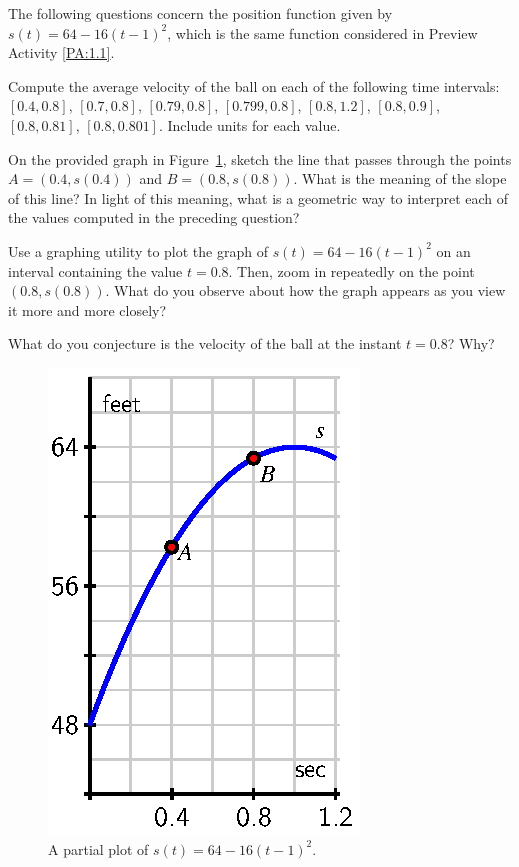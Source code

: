 \begin{activity} \label{A:1.1.1}  The following questions concern the position function given by $s(t) = 64 - 16(t-1)^2$, which is the same function considered in Preview Activity \ref{PA:1.1}.
\ba
	\item Compute the average velocity of the ball on each of the following time intervals: $[0.4,0.8]$, $[0.7,0.8]$, $[0.79, 0.8]$, $[0.799,0.8]$, $[0.8,1.2]$, $[0.8,0.9]$, $[0.8,0.81]$, $[0.8,0.801]$.  Include units for each value.
	\item On the provided graph in Figure~\ref{F:1.1.Act1}, sketch the line that passes through the points $A=(0.4, s(0.4))$ and $B=(0.8, s(0.8))$.  What is the meaning of the slope of this line?  In light of this meaning, what is a geometric way to interpret each of the values computed in the preceding question?
	\item Use a graphing utility to plot the graph of $s(t) = 64 - 16(t-1)^2$ on an interval containing the value $t = 0.8$.  Then, zoom in repeatedly on the point $(0.8, s(0.8))$.  What do you observe about how the graph appears as you view it more and more closely?  
	\item What do you conjecture is the velocity of the ball at the instant $t = 0.8$?  Why?
\ea
\begin{figure}[h]
\begin{center}
\includegraphics{figures/1_1_Act1.eps}
\caption{A partial plot of $s(t) = 64 - 16(t-1)^2$.} \label{F:1.1.Act1}
\end{center}
\end{figure}
\end{activity}
